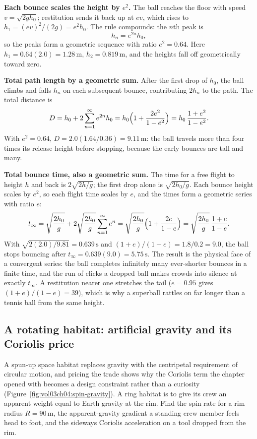 \textbf{Each bounce scales the height by $e^{2}$.} The ball reaches the
floor with speed $v=\sqrt{2gh_{0}}$; restitution sends it back up at
$ev$, which rises to $h_{1}=(ev)^{2}/(2g)=e^{2}h_{0}$. The rule
compounds: the $n$th peak is
\[
h_{n}=e^{2n}h_{0},
\]
so the peaks form a geometric sequence with ratio $e^{2}=0.64$. Here
$h_{1}=0.64(2.0)=1.28\,\si{\meter}$, $h_{2}=0.819\,\si{\meter}$, and the
heights fall off geometrically toward zero.

\textbf{Total path length by a geometric sum.} After the first drop of
$h_{0}$, the ball climbs and falls $h_{n}$ on each subsequent bounce,
contributing $2h_{n}$ to the path. The total distance is
\[
D=h_{0}+2\sum_{n=1}^{\infty}e^{2n}h_{0}=h_{0}\Bigl(1+\frac{2e^{2}}{1-
e^{2}}\Bigr)=h_{0}\,\frac{1+e^{2}}{1-e^{2}}.
\]
With $e^{2}=0.64$, $D=2.0(1.64/0.36)=9.11\,\si{\meter}$: the ball
travels more than four times its release height before stopping,
because the early bounces are tall and many.

\textbf{Total bounce time, also a geometric sum.} The time for a free
flight to height $h$ and back is $2\sqrt{2h/g}$; the first drop alone is
$\sqrt{2h_{0}/g}$. Each bounce height scales by $e^{2}$, so each flight
time scales by $e$, and the times form a geometric series with ratio
$e$:
\[
t_{\infty}=\sqrt{\frac{2h_{0}}{g}}+2\sqrt{\frac{2h_{0}}{g}}
\sum_{n=1}^{\infty}e^{n}=\sqrt{\frac{2h_{0}}{g}}\Bigl(1+\frac{2e}{1-e}
\Bigr)=\sqrt{\frac{2h_{0}}{g}}\,\frac{1+e}{1-e}.
\]
With $\sqrt{2(2.0)/9.81}=0.639\,\si{\second}$ and $(1+e)/(1-e)=1.8/0.2=
9.0$, the ball stops bouncing after $t_{\infty}=0.639(9.0)=5.75\,\si{
\second}$. The result is the physical face of a convergent series: the
ball completes infinitely many ever-shorter bounces in a finite time,
and the run of clicks a dropped ball makes crowds into silence at
exactly $t_{\infty}$. A restitution nearer one stretches the tail
($e=0.95$ gives $(1+e)/(1-e)=39$), which is why a superball rattles on
far longer than a tennis ball from the same height.

\subsection{A rotating habitat: artificial gravity and its Coriolis
price}

A spun-up space habitat replaces gravity with the centripetal
requirement of circular motion, and pricing the trade shows why the
Coriolis term the chapter opened with becomes a design constraint rather
than a curiosity (Figure~\ref{fig:vol03ch04:spin-gravity}). A ring
habitat is to give its crew an apparent weight equal to Earth gravity at
the rim. Find the spin rate for a rim radius $R=90\,\si{\meter}$, the
apparent-gravity gradient a standing crew member feels head to foot, and
the sideways Coriolis acceleration on a tool dropped from the rim.

